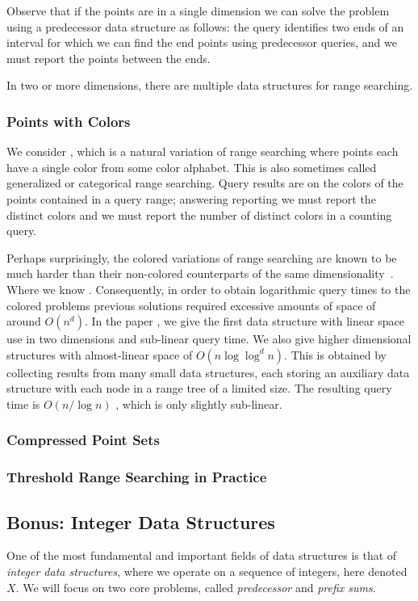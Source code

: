 Observe that if the points are in a single dimension we can solve the problem using a predecessor data structure as follows: the query identifies two ends of an interval for which we can find the end points using predecessor queries, and we must report the points between the ends.  

In two or more dimensions, there are multiple data structures for range searching.


\subsubsection{Points with Colors}
We consider , which is a natural variation of range searching where points each have a single color from some color alphabet. This is also sometimes called generalized or categorical range searching. Query results are on the colors of the points contained in a query range; answering reporting we must report the distinct colors and we must report the number of distinct colors in a counting query.

Perhaps surprisingly, the colored variations of range searching are known to be much harder than their non-colored counterparts of the same dimensionality~. Where we know . Consequently, in order to obtain logarithmic query times to the colored problems previous solutions required excessive amounts of space of around $O(n^d)$. In the paper , we give the first data structure with linear space use in two dimensions and sub-linear query time. We also give higher dimensional structures with almost-linear space of $O(n \log \log^d n)$. This is obtained by collecting results from many small data structures, each storing an auxiliary data structure with each node in a range tree of a limited size. The resulting query time is $O(n / \log n)$ , which is only slightly sub-linear.


\subsubsection{Compressed Point Sets}

\subsubsection{Threshold Range Searching in Practice}


\subsection{Bonus: Integer Data Structures}
One of the most fundamental and important fields of data structures is that of \emph{integer data structures}, where we operate on a sequence of integers, here denoted $X$. We will focus on two core problems, called \emph{predecessor} and \emph{prefix sums}.

